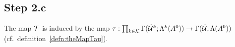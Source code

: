 \subsection{Step 2.c}
The map $\mathcal{T}$ is induced by the map
$\tau:\prod_{k\in\mathcal{K}}\Gamma(\dot {\mathcal{U}}^k;\Lambda^k(A^0))
\to\Gamma(\dot{\mathcal{U}};\Lambda(A^0))$ (cf.\ definition~\ref{defn:theMapTau}).
\begin{comment}
  For every $\theta\in\A$,
  \begin{align*}
    \tau_\theta:
    \prod_{k\in\cK_\theta}\Gamma(\dot \cU^k;\Lambda^k(A^0))
    &\to\Gamma(\dot\cU_\theta;\Lambda(A^0))
  \\(f_\theta^{k})&\mapsto f_{\theta|\dot\cU_\theta}^{k}
    &&\text{,~if~} \cK_\theta=\{k\}
  \\(f_\theta^{k_1},f_\theta^{k_2})&\mapsto
    f_{\theta|\dot\cU_\theta}^{k_1}\cdot f_{\theta|\dot\cU_\theta}^{k_2}
    &&\text{,~if~} \cK_\theta=\{k_1,h_2\}
  \end{align*}
\end{comment}

